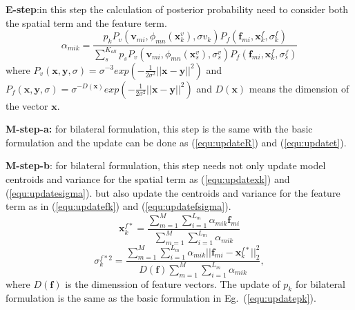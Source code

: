 \noindent\textbf{E-step}:in this step the calculation of posterior probability need to consider both the spatial term and the feature term.
\begin{equation}
\label{equ:bestep}
\alpha_{mik}=\frac{p_kP_v( \mathbf{v}_{mi},\phi_{mn}(\mathbf{x}^v_k),\sigma v_k)P_f(\mathbf f_{mi},\mathbf x^f_k,\sigma^f_k)}{\sum_s^{K_{all}}p_sP_v( \mathbf v_{mi},\phi_{mn}(\mathbf{x}^v_s),\sigma^v_s)P_f(\mathbf f_{mi},\mathbf{x}^f_k,\sigma^f_s)}
\end{equation}
where $P_v(\mathbf{x},\mathbf{y},\sigma)=\sigma^{-3}exp(-\frac{1}{2\sigma^2}||\mathbf{x}-\mathbf{y}||^2)$ and $P_f(\mathbf{x},\mathbf{y},\sigma)=\sigma^{-D(\mathbf{x})}exp(-\frac{1}{2\sigma^2}||\mathbf{x}-\mathbf{y}||^2)$ and $D(\mathbf{x})$ means the dimension of the vector $\mathbf x$. 

\textbf{M-step-a:} for bilateral formulation, this step is the same with the basic formulation and the update can be done as (\ref{equ:updateR}) and (\ref{equ:updatet}).

\textbf{M-step-b}: for bilateral formulation, this step needs not only update model centroids and variance for the spatial term as (\ref{equ:updatexk}) and (\ref{equ:updatesigma}).
but also update the centroids and variance for the feature term as in (\ref{equ:updatefk}) and (\ref{equ:updatefsigma}).
\begin{equation}
\label{equ:updatefk}
\mathbf{x}_k^{f*}=\frac{\sum_{m=1}^M\sum_{i=1}^{L_m}\alpha_{mik}\mathbf{f}_{mi}}{\sum_{m=1}^M\sum_{i=1}^{L_m}\alpha_{mik}}
\end{equation}
\begin{equation}
\label{equ:updatefsigma}
\sigma_k^{f*2}=\frac{\sum_{m=1}^M\sum_{i=1}^{L_m}\alpha_{mik}||\mathbf {f}_{mi}-\mathbf{x}_k^{f*}||_2^2}{D(\mathbf{f})\sum_{m=1}^M\sum_{i=1}^{L_m}\alpha_{mik}},
\end{equation}
where $D(\mathbf{f})$ is the dimenssion of feature vectors. The update of $p_k$ for bilateral formulation is the same as the basic formulation in Eg.~(\ref{equ:updatepk}).
